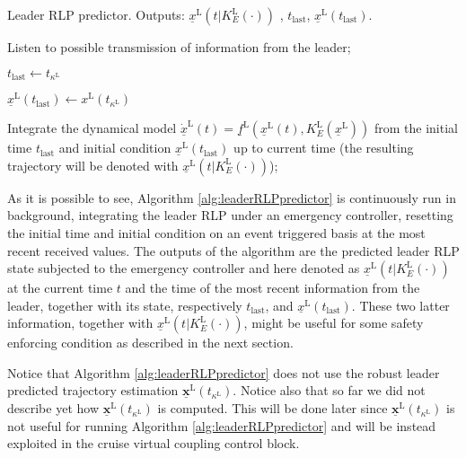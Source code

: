 \documentclass[letterpaper, 10 pt, conference]{ieeeconf}
\theoremstyle{definition}
\theoremstyle{nopoint}
\begin{document}
\begin{algorithm}
\caption{Leader RLP predictor. Outputs: $\underline{x}^\mathrm{L}(t|K_E^\mathrm{L}(\cdot))$ , $t_{\mathrm{last}}$, $\underline{x}^\mathrm{L}(t_{\mathrm{last}})$. }\label{alg:leaderRLPpredictor}
\begin{algorithmic}[1]
\Loop

\State Listen to possible transmission of information from the leader;

 
\State $t_{\mathrm{last}} \leftarrow t_{\kappa^\mathrm{L}}$

\State $\underline{x}^\mathrm{L}(t_{\mathrm{last}}) \leftarrow x^\mathrm{L}(t_{\kappa^\mathrm{L}})$

\EndIf


\State Integrate the dynamical model  $\underline{\dot{x}}^\mathrm{L}(t) = \underline{f}^\mathrm{L}(\underline{x}^\mathrm{L}(t),K_E^\mathrm{L}(\underline{x}^\mathrm{L}))$ from the initial time $t_{\mathrm{last}}$ and initial condition $\underline{x}^\mathrm{L}(t_{\mathrm{last}})$  up to current time (the resulting trajectory will be denoted
with $\underline{x}^\mathrm{L}(t|K_E^\mathrm{L}(\cdot))$);



\EndLoop

\end{algorithmic}
\end{algorithm}


As it is possible to see, Algorithm \ref{alg:leaderRLPpredictor} is continuously run in background, integrating the leader RLP under an emergency controller, resetting the initial time and initial condition on an event triggered basis at the most recent received values. 
The outputs of the algorithm are the predicted leader RLP state subjected to the emergency controller and here denoted as $\underline{x}^\mathrm{L}(t|K_E^\mathrm{L}(\cdot))$ at the current time $t$ and the time of the most recent information from the leader, together with its state, respectively $t_{\mathrm{last}}$, and $\underline{x}^\mathrm{L}(t_{\mathrm{last}})$. These two latter information, together with $\underline{x}^\mathrm{L}(t|K_E^\mathrm{L}(\cdot))$, might be useful for some safety enforcing condition as described in the next section. 


Notice that Algorithm \ref{alg:leaderRLPpredictor} does not use the robust leader predicted trajectory estimation $\underline{\mathbf{x}}^\mathrm{L}(t_{\kappa^\mathrm{L}})$.
Notice also that so far we did not describe yet how $\underline{\mathbf{x}}^\mathrm{L}(t_{\kappa^\mathrm{L}})$ is computed. This will be done later since $\underline{\mathbf{x}}^\mathrm{L}(t_{\kappa^\mathrm{L}})$ is not useful for running Algorithm \ref{alg:leaderRLPpredictor} and will be instead exploited in the cruise virtual coupling control block. 
\end{document}
